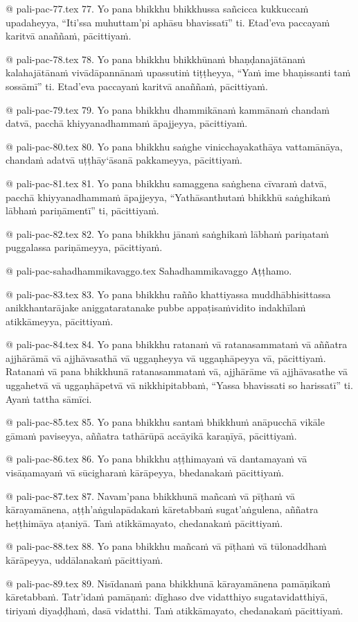 @ pali-pac-77.tex
77. Yo pana bhikkhu bhikkhussa sañcicca kukkuccaṁ upadaheyya, “Iti’ssa muhuttam’pi aphāsu bhavissatī” ti. Etad’eva paccayaṁ karitvā anaññaṁ, pācittiyaṁ.

@ pali-pac-78.tex
78. Yo pana bhikkhu bhikkhūnaṁ bhaṇḍanajātānaṁ kalahajātānaṁ vivādāpannānaṁ upassutiṁ tiṭṭheyya, “Yaṁ ime bhaṇissanti taṁ sossāmī” ti. Etad’eva paccayaṁ karitvā anaññaṁ, pācittiyaṁ.

@ pali-pac-79.tex
79. Yo pana bhikkhu dhammikānaṁ kammānaṁ chandaṁ datvā, pacchā khiyyanadhammaṁ āpajjeyya, pācittiyaṁ.

@ pali-pac-80.tex
80. Yo pana bhikkhu saṅghe vinicchayakathāya vattamānāya, chandaṁ adatvā uṭṭhāy‘āsanā pakkameyya, pācittiyaṁ.

@ pali-pac-81.tex
81. Yo pana bhikkhu samaggena saṅghena cīvaraṁ datvā, pacchā khiyyanadhammaṁ āpajjeyya, “Yathāsanthutaṁ bhikkhū saṅghikaṁ lābhaṁ pariṇāmentī” ti, pācittiyaṁ.

@ pali-pac-82.tex
82. Yo pana bhikkhu jānaṁ saṅghikaṁ lābhaṁ pariṇataṁ puggalassa pariṇāmeyya, pācittiyaṁ.

@ pali-pac-sahadhammikavaggo.tex
Sahadhammikavaggo Aṭṭhamo.

@ pali-pac-83.tex
83. Yo pana bhikkhu rañño khattiyassa muddhābhisittassa anikkhantarājake aniggataratanake pubbe appaṭisaṁvidito indakhīlaṁ atikkāmeyya, pācittiyaṁ.

@ pali-pac-84.tex
84. Yo pana bhikkhu ratanaṁ vā ratanasammataṁ vā aññatra ajjhārāmā vā ajjhāvasathā vā uggaṇheyya vā uggaṇhāpeyya vā, pācittiyaṁ. Ratanaṁ vā pana bhikkhunā ratanasammataṁ vā, ajjhārāme vā ajjhāvasathe vā uggahetvā vā uggaṇhāpetvā vā nikkhipitabbaṁ, “Yassa bhavissati so harissatī” ti. Ayaṁ tattha sāmīci.

@ pali-pac-85.tex
85. Yo pana bhikkhu santaṁ bhikkhuṁ anāpucchā vikāle gāmaṁ paviseyya, aññatra tathārūpā accāyikā karaṇīyā, pācittiyaṁ.

@ pali-pac-86.tex
86. Yo pana bhikkhu aṭṭhimayaṁ vā dantamayaṁ vā visāṇamayaṁ vā sūcigharaṁ kārāpeyya, bhedanakaṁ pācittiyaṁ.

@ pali-pac-87.tex
87. Navam’pana bhikkhunā mañcaṁ vā pīṭhaṁ vā kārayamānena, aṭṭh’aṅgulapādakaṁ kāretabbaṁ sugat’aṅgulena, aññatra heṭṭhimāya aṭaniyā. Taṁ atikkāmayato, chedanakaṁ pācittiyaṁ.

@ pali-pac-88.tex
88. Yo pana bhikkhu mañcaṁ vā pīṭhaṁ vā tūlonaddhaṁ kārāpeyya, uddālanakaṁ pācittiyaṁ.

@ pali-pac-89.tex
89. Nisīdanaṁ pana bhikkhunā kārayamānena pamāṇikaṁ kāretabbaṁ. Tatr’idaṁ pamāṇaṁ: dīghaso dve vidatthiyo sugatavidatthiyā, tiriyaṁ diyaḍḍhaṁ, dasā vidatthi. Taṁ atikkāmayato, chedanakaṁ pācittiyaṁ.

